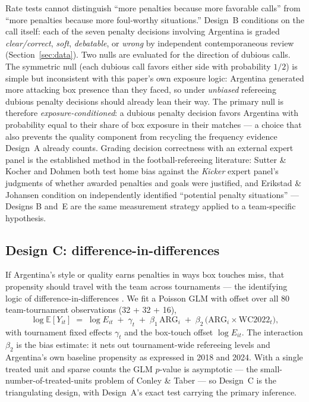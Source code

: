 \documentclass[11pt,a4paper]{article}
\begin{document}
Rate tests cannot distinguish ``more penalties because more favorable calls'' from
``more penalties because more foul-worthy situations.'' Design~B conditions on the
call itself: each of the seven penalty decisions involving Argentina is graded
\emph{clear/correct}, \emph{soft}, \emph{debatable}, or \emph{wrong} by independent
contemporaneous review (Section~\ref{sec:data}). Two nulls are evaluated for the
direction of dubious calls. The symmetric null (each dubious call favors either side
with probability $1/2$) is simple but inconsistent with this paper's own exposure
logic: Argentina generated more attacking box presence than they faced, so under
\emph{unbiased} refereeing dubious penalty decisions should already lean their way.
The primary null is therefore \emph{exposure-conditioned}: a dubious penalty decision
favors Argentina with probability equal to their share of box exposure in their
matches --- a choice that also prevents the quality component from recycling the
frequency evidence Design~A already counts. Grading decision correctness with an external
expert panel is the established method in the football-refereeing literature:
Sutter \& Kocher \cite{sutter2004} and Dohmen \cite{dohmen2008} both test home bias against the
\emph{Kicker} expert panel's judgments of whether awarded penalties and goals were
justified, and Erikstad \& Johansen \cite{erikstad2020} condition on independently identified
``potential penalty situations'' --- Designs B and~E are the same measurement
strategy applied to a team-specific hypothesis.

\subsection{Design C: difference-in-differences}

If Argentina's style or quality earns penalties in ways box touches miss, that
propensity should travel with the team across tournaments --- the identifying logic
of difference-in-differences \cite{angrist2009mostly}. We fit a Poisson GLM with
offset \cite{mccullagh1989glm} over
all 80 team-tournament observations (32 + 32 + 16),
\begin{equation}
\log \mathbb{E}[Y_{it}] \;=\; \log E_{it} \;+\; \gamma_t \;+\; \beta_1\,
\text{ARG}_i \;+\; \beta_2\, \big(\text{ARG}_i \times \text{WC2022}_t\big),
\label{eq:did}
\end{equation}
with tournament fixed effects $\gamma_t$ and the box-touch offset $\log E_{it}$. The
interaction $\beta_2$ is the bias estimate: it nets out tournament-wide refereeing
levels and Argentina's own baseline propensity as expressed in 2018 and 2024. With a
single treated unit and sparse counts the GLM $p$-value is asymptotic --- the
small-number-of-treated-units problem of Conley \& Taber \cite{conley2011} --- so Design~C is
the triangulating design, with Design~A's exact test carrying the primary
inference.
\end{document}
